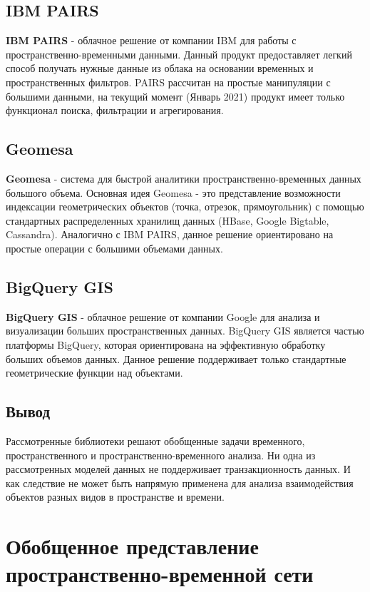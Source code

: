 \subsection*{IBM PAIRS}
\textbf{IBM PAIRS} - облачное решение от компании IBM для работы с пространственно-временными данными. Данный продукт предоставляет легкий способ получать нужные данные из облака на основании временных и пространственных фильтров.
PAIRS рассчитан на простые манипуляции с большими данными, на текущий момент (Январь 2021) продукт имеет только функционал поиска, фильтрации и агрегирования.

\subsection*{Geomesa}
\textbf{Geomesa} - система для быстрой аналитики пространственно-временных данных большого объема. Основная идея Geomesa - это представление возможности индексации геометрических объектов (точка, отрезок, прямоугольник) с помощью стандартных распределенных хранилищ данных (HBase, Google Bigtable, Cassandra).
Аналогично с IBM PAIRS, данное решение ориентировано на простые операции с большими объемами данных.

\subsection*{BigQuery GIS}
\textbf{BigQuery GIS} - облачное решение от компании Google для анализа и визуализации больших пространственных данных. BigQuery GIS является частью платформы BigQuery, которая ориентирована на эффективную обработку больших объемов данных. Данное решение поддерживает только стандартные геометрические функции над объектами.


\subsection*{Вывод}
Рассмотренные библиотеки решают обобщенные задачи временного, пространственного и пространственно-временного анализа. Ни одна из рассмотренных моделей данных не поддерживает транзакционность данных. И как следствие не может быть напрямую применена для анализа взаимодействия объектов разных видов в пространстве и времени. 


\section{Обобщенное представление пространственно-временной сети}\label{sec:ch1/sec2}

